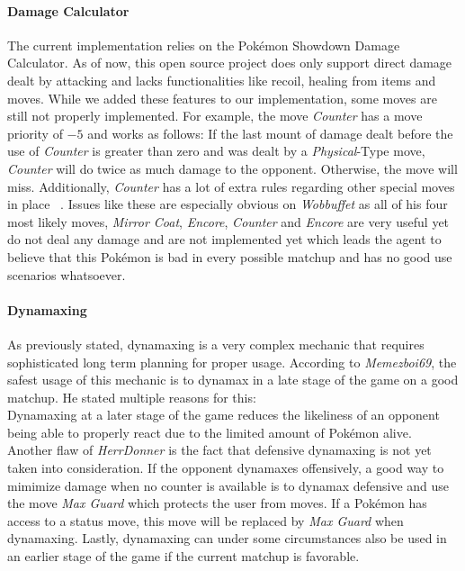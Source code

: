 \paragraph{Damage Calculator}
The current implementation relies on the Pokémon Showdown Damage Calculator. As of now, this open source project does 
only support direct damage dealt by attacking and lacks functionalities like recoil, healing from items and moves. While
we added these features to our implementation, some moves are still not properly implemented. For example, the move
\textit{Counter} has a move priority of $-5$ and works as follows:
If the last mount of damage dealt before the use of \textit{Counter} is greater than zero and was dealt by a 
\textit{Physical}-Type move, \textit{Counter} will do twice as much damage to the opponent. Otherwise, the move
will miss. Additionally, \textit{Counter} has a lot of extra rules regarding other special moves in place 
~\autocite{Bulbapedia:Counter}. Issues like these are especially obvious on \textit{Wobbuffet} as all of his four
most likely moves, \textit{Mirror Coat}, \textit{Encore}, \textit{Counter} and \textit{Encore} are very useful
yet do not deal any damage and are not implemented yet which leads the agent to believe that this Pokémon is bad 
in every possible matchup and has no good use scenarios whatsoever.

\paragraph{Dynamaxing}
\label{par:eval-dynamx}
As previously stated, dynamaxing is a very complex mechanic that requires sophisticated long term planning for
proper usage. According to \textit{Memezboi69}, the safest usage of this mechanic is to dynamax in a late stage
of the game on a good matchup. He stated multiple reasons for this: \\
Dynamaxing at a later stage of the game reduces the likeliness of an opponent being able to properly react due to the 
limited amount of Pokémon alive. \\
Another flaw of \textit{HerrDonner} is the fact that defensive dynamaxing is not yet taken into consideration. 
If the opponent dynamaxes offensively, a good way to mimimize damage when no counter is available is to dynamax
defensive and use the move \textit{Max Guard} which protects the user from moves. If a Pokémon has access to 
a status move, this move will be replaced by \textit{Max Guard} when dynamaxing. Lastly, dynamaxing can under 
some circumstances also be used in an earlier stage of the game if the current matchup is favorable. 


